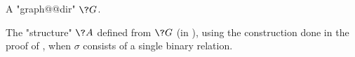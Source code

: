 \begin{marginfigure}[-3.5cm]
	\centering
	\begin{tikzpicture}
		
	\end{tikzpicture}
	\caption{
		\AP\label{fig:graph-to-struct-graph}
		A "graph@@dir" $\?G$.
	}
\end{marginfigure}
\begin{marginfigure}[-.5cm]
	\centering
	\begin{tikzpicture}
		
	\end{tikzpicture}
	\caption{
		\AP\label{fig:graph-to-struct-struct}
		The "structure" $\?A$ defined from $\?G$ (in ),
		using the construction done in the proof of ,
		when $\sigma$ consists of a single binary relation.
	}
\end{marginfigure}

